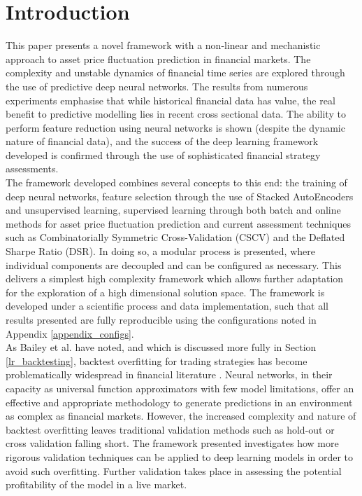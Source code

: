 \documentclass[a4paper,11pt,oneside]{article}
\theoremstyle{plain}
\theoremstyle{definition}
\begin{document}
	\newpage
	
	
	\section{Introduction}\label{Introduction}
	
	
	This paper presents a novel framework with a non-linear and mechanistic approach to asset price fluctuation prediction in financial markets. The complexity and unstable dynamics of financial time series are explored through the use of predictive deep neural networks. The results from numerous experiments emphasise that while historical financial data has value, the real benefit to predictive modelling lies in recent cross sectional data. The ability to perform feature reduction using neural networks is shown (despite the dynamic nature of financial data), and the success of the deep learning framework developed is confirmed through the use of sophisticated financial strategy assessments. 
	~\\\newline
	The framework developed combines several concepts to this end: the training of deep neural networks, feature selection through the use of Stacked AutoEncoders and unsupervised learning, supervised learning through both batch and online methods for asset price fluctuation prediction and current assessment techniques such as Combinatorially Symmetric Cross-Validation (CSCV) and the Deflated Sharpe Ratio (DSR). In doing so, a modular process is presented, where individual components are decoupled and can be configured as necessary. This delivers a simplest high complexity framework which allows further adaptation for the exploration of a high dimensional solution space. The framework is developed under a scientific process and data implementation, such that all results presented are fully reproducible using the configurations noted in Appendix \ref{appendix_configs}.
	~\\\newline
	As Bailey et al. have noted, and which is discussed more fully in Section \ref{lr_backtesting}, backtest overfitting for trading strategies has become problematically widespread in financial literature \citep{BailyPBO}. Neural networks, in their capacity as universal function approximators with few model limitations, offer an effective and appropriate methodology to generate predictions in an environment as complex as financial markets. However, the increased complexity and nature of backtest overfitting leaves traditional validation methods such as hold-out or cross validation falling short. The framework presented investigates how more rigorous validation techniques can be applied to deep learning models in order to avoid such overfitting. Further validation takes place in assessing the potential profitability of the model in a live market.
\end{document}
